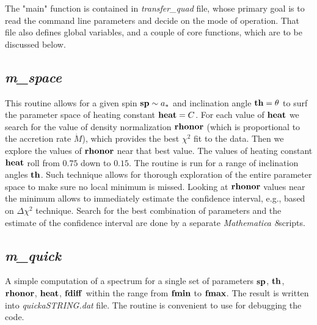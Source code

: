 \documentclass{emulateapj}
\newcommand{\mat}{\textit{Mathematica 8}}
\begin{document}
The "main" function is contained in \textit{transfer\_quad} file, whose primary goal is to read the
command line parameters and decide on the mode of operation. That file also defines global variables,
and a couple of core functions, which are to be discussed below.

\subsection{\textit{m\_space}}
This routine allows for a given spin ${\bf sp}\sim a_*$ and inclination angle ${\bf th}=\theta$ to surf the parameter space of heating constant ${\bf heat}=C$.
For each value of ${\bf heat}$ we search for the value of density normalization ${\bf rhonor}$ (which is proportional to the accretion rate $\dot{M}$), which provides the best $\chi^2$ fit to the data.
Then we explore the values of ${\bf rhonor}$ near that best value.
The values of heating constant ${\bf heat}$ roll from $0.75$ down to $0.15$.
The routine is run for a range of inclination angles ${\bf th}$.
Such technique allows for thorough exploration of the entire parameter space to make sure no local minimum is missed.
Looking at ${\bf rhonor}$ values near the minimum allows to immediately estimate the confidence interval, e.g., based on $\Delta\chi^2$ technique.
Search for the best combination of parameters and the estimate of the confidence interval are done by a separate \mat  scripts.

\subsection{\textit{m\_quick}}
A simple computation of a spectrum for a single set of parameters ${\bf sp}$, ${\bf th}$, ${\bf rhonor}$, ${\bf heat}$, ${\bf fdiff}$ within the range from
${\bf fmin}$ to ${\bf fmax}$. The result is written into \textit{quickaSTRING.dat} file.
The routine is convenient to use for debugging the code.
\end{document}
